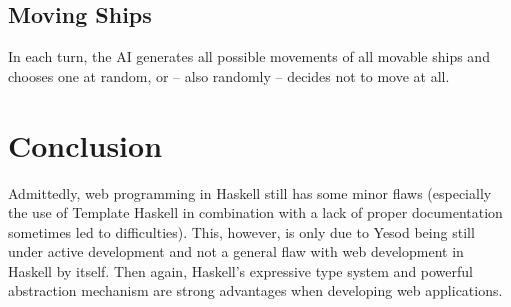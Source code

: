 \documentclass[a4paper]{easychair}
\begin{document}
\subsection{Moving Ships}
In each turn, the AI generates all possible movements of all movable ships and chooses one at random, or -- also randomly -- decides not to move at all. %

\section{Conclusion}

Admittedly, web programming in Haskell still has some minor flaws (especially the use of Template Haskell in combination with a lack of proper documentation sometimes led to difficulties). This, however, is only due to Yesod being still under active development and not a general flaw with web development in Haskell by itself. Then again, Haskell's expressive type system and powerful abstraction mechanism are strong advantages when developing web applications.


%
\label{sect:bib}

%
%
%
%


\end{document}
